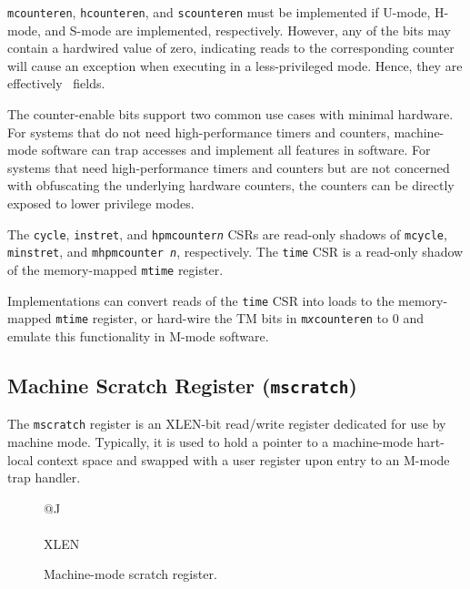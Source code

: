{\tt mcounteren}, {\tt hcounteren}, and {\tt scounteren} must be implemented
if U-mode, H-mode, and S-mode are implemented, respectively.
However, any of the bits may contain
a hardwired value of zero, indicating reads to the corresponding counter will
cause an exception when executing in a less-privileged mode.
Hence, they are effectively \warl\ fields.
\begin{commentary}
The counter-enable bits support two common use cases with minimal hardware.
For systems that do not need high-performance timers and counters,
machine-mode software can trap accesses and implement all features in
software.  For systems that need high-performance timers and counters
but are not concerned with obfuscating the underlying hardware
counters, the counters can be directly exposed to lower privilege modes.
\end{commentary}

The {\tt cycle}, {\tt instret}, and {\tt hpmcounter{\em n}} CSRs are
read-only shadows of {\tt mcycle}, {\tt minstret}, and {\tt mhpmcounter{\em
n}}, respectively.  The {\tt time} CSR is a read-only shadow of the
memory-mapped {\tt mtime} register.
\begin{commentary}
Implementations can convert reads of the {\tt time} CSR into loads to
the memory-mapped {\tt mtime} register, or hard-wire the TM bits in
{\tt m{\em x}counteren} to 0
and emulate this functionality in M-mode software.
\end{commentary}

\subsection{Machine Scratch Register ({\tt mscratch})}

The {\tt mscratch} register is an XLEN-bit read/write register
dedicated for use by machine mode.  Typically, it is used to hold a
pointer to a machine-mode hart-local context space and swapped with a
user register upon entry to an M-mode trap handler.

\begin{figure}[h!]
{\footnotesize
\begin{center}
\begin{tabular}{@{}J}
 \\
\hline
{} \\
\hline
XLEN \\
\end{tabular}
\end{center}
}
\vspace{-0.1in}
\caption{Machine-mode scratch register.}
\label{mscratchreg}
\end{figure}

